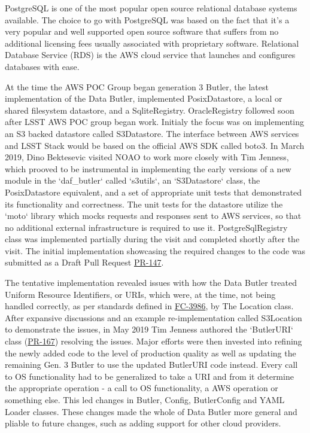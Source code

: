 PostgreSQL is one of the most popular open source relational database systems available. The choice to go with PostgreSQL was based on the fact that it's a very popular and well supported open source software that suffers from no additional licensing fees usually associated with proprietary software. Relational Database Service (RDS) is the AWS cloud service that launches and configures databases with ease. 

At the time the AWS POC Group began generation 3 Butler, the latest implementation of the Data Butler, implemented PosixDatastore, a local or shared filesystem datastore, and a SqliteRegistry. OracleRegistry followed soon after LSST AWS POC group began work. Initialy the focus was on implementing an S3 backed datastore called S3Datastore. The interface between AWS services and LSST Stack would be based on the official AWS SDK called boto3. In March 2019, Dino Bektesevic visited NOAO to work more closely with Tim Jenness, which prooved to be instrumental in implementing the early versions of a new module in the `daf\_butler` called `s3utils`, an `S3Datastore` class, the PosixDatastore equivalent, and a set of appropriate unit tests that demonstrated its functionality and correctness. The unit tests for the datastore utilize the `moto` library which mocks requests and responses sent to AWS services, so that no additional external infrastructure is required to use it. PostgreSqlRegistry class was implemented partially during the visit and completed shortly after the visit. The initial implementation showcasing the required changes to the code was submitted as a Draft Pull Request \href{https://github.com/lsst/daf_butler/pull/147}{PR-147}. 

The tentative implementation revealed issues with how the Data Butler treated Uniform Resource Identifiers, or URIs, which were, at the time, not being handled correctly, as per standards defined in \href{https://tools.ietf.org/html/rfc3986}{FC-3986}, by The Location class. After expansive discussions and an example re-implementation called S3Location to demonstrate the issues, in May 2019 Tim Jenness authored the `ButlerURI` class (\href{https://github.com/lsst/daf_butler/pull/167}{PR-167}) resolving the issues. Major efforts were then invested into refining the newly added code to the level of production quality as well as updating the remaining Gen. 3 Butler to use the updated ButlerURI code instead. Every call to OS functionality had to be generalized to take a URI and from it determine the appropriate operation - a call to OS functionality, a AWS operation or something else. This led changes in Butler, Config, ButlerConfig and YAML Loader classes. These changes made the whole of Data Butler more general and pliable to future changes, such as adding support for other cloud providers. 

